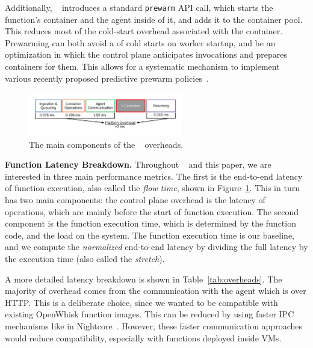 Additionally, \sysname~ introduces a standard \texttt{prewarm}  API call, which starts the function's container and the agent inside of it, and adds it to the container pool.
This reduces most of the cold-start overhead associated with the container.
Prewarming can both avoid a  of cold starts on worker startup, and be an optimization in which the control plane anticipates invocations and prepares containers for them. 
This allows for a systematic mechanism to implement various recently proposed predictive prewarm policies~\cite{roy2022icebreaker, shahrad_serverless_2020, silva_prebaking_2020}. 





\begin{figure}
\centering 
\includegraphics[width=0.6\textwidth]{iluvatar/figs/OverheadTimeline.pdf}
\caption{The main components of the \sysname~ overheads.}
\label{fig:timeline-flow}
\end{figure}


\noindent \textbf{Function Latency Breakdown.}
Throughout \sysname~ and this paper, we are interested in three main performance metrics. 
The first is the end-to-end latency of function execution, also called the \emph{flow time}, shown in Figure~\ref{fig:timeline-flow}.
This in turn has two main components: the control plane overhead is the latency of \sysname~ operations, which are mainly before the start of function execution.
The second component is the function execution time, which is determined by the function code, and the load on the system.
The function execution time is our baseline, and we compute the \emph{normalized} end-to-end latency by dividing the full latency by the execution time (also called the \emph{stretch}). 

A more detailed latency breakdown is shown in Table~\ref{tab:overheads}.
The majority of overhead comes from the communication with the agent which is over HTTP. 
This is a deliberate choice, since we wanted to be compatible with existing OpenWhisk function images.
This can be reduced by using faster IPC mechanisms like in Nightcore~\cite{jia2021nightcore}. 
However, these faster communication approaches would reduce compatibility, especially with functions deployed inside VMs.

